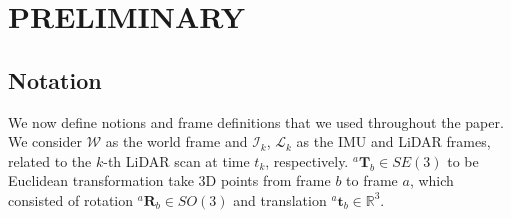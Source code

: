 \documentclass[letterpaper, 10 pt, conference]{ieeeconf}  %
\begin{document}
\section{PRELIMINARY}
\label{sec:preliminary}

\subsection{Notation}
\label{sec:notation}
We now define notions and frame definitions that we used throughout the paper.
We consider $\mathcal{W} $ as the world frame and ${\mathcal{I} _k}$, ${\mathcal{L} _k}$ as the IMU and LiDAR frames, related to the $k$-th LiDAR scan at time $t_k$, respectively.
$^a\mathbf{T}_b \in SE(3)$ to be Euclidean transformation take 3D points from frame $b$ to frame $a$, which consisted of rotation $^a\mathbf{R}_b \in SO(3)$  and translation $^a\mathbf{t}_b \in \mathbb{R}^3$.
\end{document}
